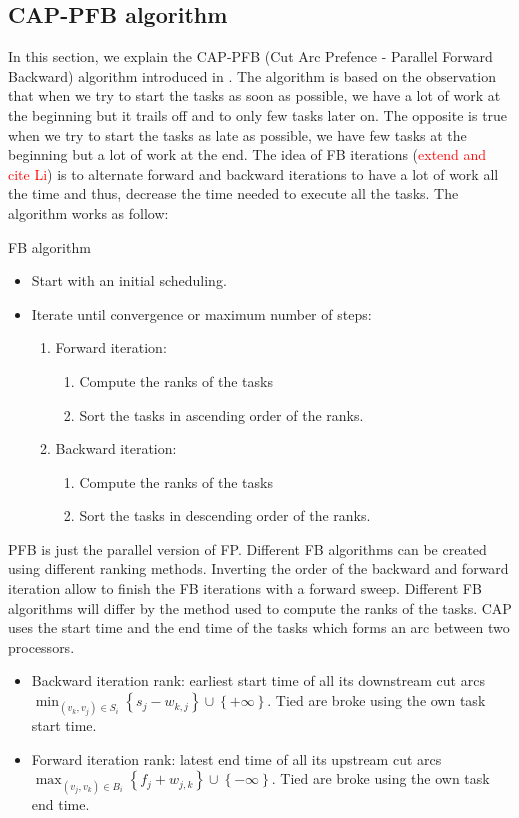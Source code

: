 \documentclass[letterpaper]{article}
\newcommand\red{\textcolor{red}}
\renewcommand{\(}{\left(}
\renewcommand{\)}{\right)}
\renewcommand{\[}{\left[}
\renewcommand{\]}{\right]}
\begin{document}
\subsection{CAP-PFB algorithm}
In this section, we explain the CAP-PFB (Cut Arc Prefence - Parallel Forward
Backward) algorithm introduced in
\cite{Mo2014}. The algorithm is based on the observation that when we try to
start the tasks as soon as possible, we have a lot of work at the beginning but
it trails off and to only few tasks later on. The opposite is true when we try
to start the tasks as late as possible, we have few tasks at the beginning but a
lot of work at the end. The idea of FB iterations (\red{extend and cite Li}) is 
to alternate forward and backward iterations to have a lot of work all the time 
and thus, decrease the time needed to execute all the tasks. The algorithm works 
as follow:
\begin{algorithm}[H]
  \caption{FB algorithm}
  \begin{itemize}
    \item Start with an initial scheduling.
    \item Iterate until convergence or maximum number of steps:
      \begin{enumerate}
        \item Forward iteration:
          \begin{enumerate}
            \item Compute the ranks of the tasks
            \item Sort the tasks in ascending order of the ranks.
          \end{enumerate}
        \item Backward iteration:
          \begin{enumerate}
            \item Compute the ranks of the tasks
            \item Sort the tasks in descending order of the ranks.
          \end{enumerate}
      \end{enumerate}
  \end{itemize}
\end{algorithm}
PFB is just the parallel version of FP. Different FB algorithms can be created
using different ranking methods. Inverting the order of the backward and forward
iteration allow to finish the FB iterations with a forward sweep. Different FB
algorithms will differ by the method used to compute the ranks of the tasks. CAP
uses the start time and the end time of the tasks which forms an arc between two
processors. 
\begin{itemize}
  \item Backward iteration rank: earliest start time of all its downstream cut
    arcs $\min_{(v_k,v_j)\in S_i}\left\{s_j-w_{k,j}\right\} \cup
    \left\{+\infty\right\}$. Tied are broke using the own task start time.
  \item Forward iteration rank: latest end time of all its upstream cut arcs
    $\max_{(v_j,v_k)\in B_i} \left\{f_j+w_{j,k}\right\} \cup
    \left\{-\infty\right\}$. Tied are broke using the own task end time.
\end{itemize}
\end{document}
